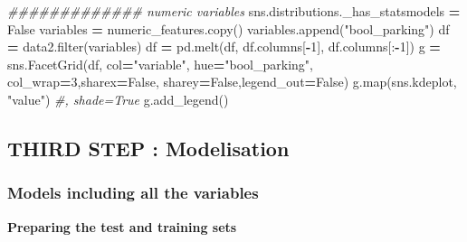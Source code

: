 \documentclass[10pt,a4paper]{article}
\newenvironment{Shaded}{\begin{snugshade}}{\end{snugshade}}
\newcommand{\BuiltInTok}[1]{#1}
\newcommand{\CommentTok}[1]{\textcolor[rgb]{0.56,0.35,0.01}{\textit{#1}}}
\newcommand{\DecValTok}[1]{\textcolor[rgb]{0.00,0.00,0.81}{#1}}
\newcommand{\NormalTok}[1]{#1}
\newcommand{\OperatorTok}[1]{\textcolor[rgb]{0.81,0.36,0.00}{\textbf{#1}}}
\newcommand{\StringTok}[1]{\textcolor[rgb]{0.31,0.60,0.02}{#1}}
\newcommand{\VariableTok}[1]{\textcolor[rgb]{0.00,0.00,0.00}{#1}}
\theoremstyle{break}
\begin{document}
\begin{Shaded}
\begin{Highlighting}[]
\CommentTok{############# numeric variables}
\NormalTok{sns.distributions._has_statsmodels }\OperatorTok{=} \VariableTok{False}
\NormalTok{variables }\OperatorTok{=}\NormalTok{ numeric_features.copy()}
\NormalTok{variables.append(}\StringTok{"bool_parking"}\NormalTok{)}
\NormalTok{df }\OperatorTok{=}\NormalTok{ data2.}\BuiltInTok{filter}\NormalTok{(variables)}
\NormalTok{df }\OperatorTok{=}\NormalTok{ pd.melt(df, df.columns[}\OperatorTok{-}\DecValTok{1}\NormalTok{], df.columns[:}\OperatorTok{-}\DecValTok{1}\NormalTok{])}
\NormalTok{g }\OperatorTok{=}\NormalTok{ sns.FacetGrid(df, col}\OperatorTok{=}\StringTok{"variable"}\NormalTok{, hue}\OperatorTok{=}\StringTok{"bool_parking"}\NormalTok{,}
\NormalTok{                  col_wrap}\OperatorTok{=}\DecValTok{3}\NormalTok{,sharex}\OperatorTok{=}\VariableTok{False}\NormalTok{, sharey}\OperatorTok{=}\VariableTok{False}\NormalTok{,legend_out}\OperatorTok{=}\VariableTok{False}\NormalTok{)}
\NormalTok{g.}\BuiltInTok{map}\NormalTok{(sns.kdeplot, }\StringTok{"value"}\NormalTok{) }\CommentTok{#, shade=True}
\NormalTok{g.add_legend()}
\end{Highlighting}
\end{Shaded}

\hypertarget{third-step-modelisation-1}{%
\subsection{THIRD STEP : Modelisation}\label{third-step-modelisation-1}}

\hypertarget{models-including-all-the-variables-1}{%
\subsubsection{Models including all the variables}\label{models-including-all-the-variables-1}}

\textbf{Preparing the test and training sets}
\end{document}
